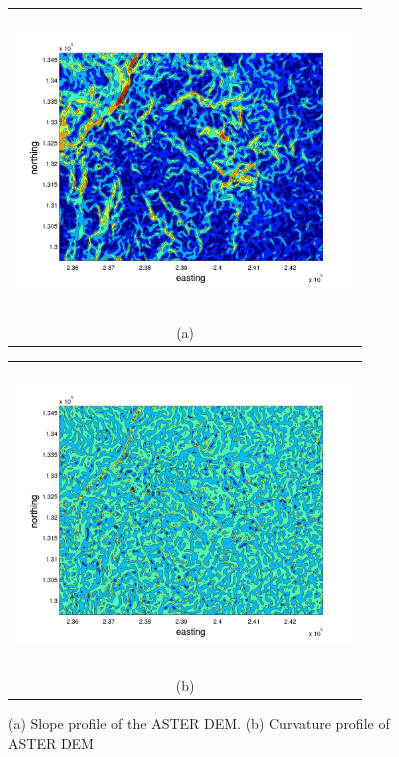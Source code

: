 \documentclass[a4paper,fleqn]{article}
\begin{document}
\begin{figure}[H]
    \begin{minipage}[b]{0.6\textwidth}
        \begin{tabular}{c}
        \includegraphics[width=9cm,height=8cm,keepaspectratio]{slope_profile.jpg}\\
        (a)
        \end{tabular}
    \end{minipage}
    \begin{minipage}{0.6\textwidth}
        \begin{tabular}{c}
        \includegraphics[width=9cm,height=8cm,keepaspectratio]{curvature_profile.jpg}\\
        (b)
        \end{tabular}
    \end{minipage} 
\caption{(a) Slope profile of the ASTER DEM. (b) Curvature profile of ASTER DEM}
\label{fig5}  
\end{figure}
\end{document}
